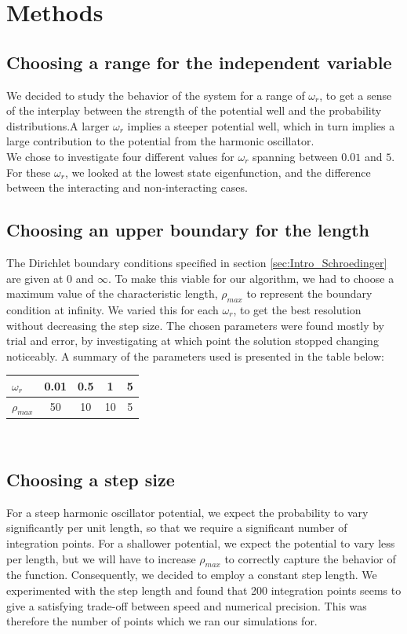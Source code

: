 \documentclass[a4paper, 10pt]{article}
\begin{document}
\section{Methods}
\subsection{Choosing a range for the independent variable}
We decided to study the behavior of the system for a range of $\omega_r$, to get a sense of the interplay between the strength of the potential well and the probability distributions.A larger $\omega_r$ implies a steeper potential well, which in turn implies a large contribution to the potential from the harmonic oscillator.\\
\linebreak 
We chose to investigate four different values for $\omega_r$ spanning between $0.01$ and $5$. For these $\omega_r$, we looked at the lowest state eigenfunction, and the difference between the interacting and non-interacting cases. 
\subsection{Choosing an upper boundary for the length}
The Dirichlet boundary conditions specified in section \ref{sec:Intro_Schroedinger} are given at $0$ and $\infty$. To make this viable for our algorithm, we had to choose a maximum value of the characteristic length, $\rho_{max}$ to represent the boundary condition at infinity. We varied this for each $\omega_r$, to get the best resolution without decreasing the step size. The chosen parameters were found mostly by trial and error, by investigating at which point the solution stopped changing noticeably. A summary of the parameters used is presented in the table below:\\

\begin{tabular}{|l||c|c|c|c|}
\hline
$\omega_r$ & 0.01 & 0.5 & 1 & 5 \\
\hline
$\rho_{max}$ & 50 & 10 & 10 & 5 \\
\hline
\end{tabular}\\
\subsection{Choosing a step size}
For a steep harmonic oscillator potential, we expect the probability to vary significantly per unit length, so that we require a significant number of integration points. For a shallower potential, we expect the potential to vary less per length, but we will have to increase $\rho_{max}$ to correctly capture the behavior of the function. Consequently, we decided to employ a constant step length. We experimented with the step length and found that 200 integration points seems to give a satisfying trade-off between speed and numerical precision. This was therefore the number of points which we ran our simulations for.
\end{document}

